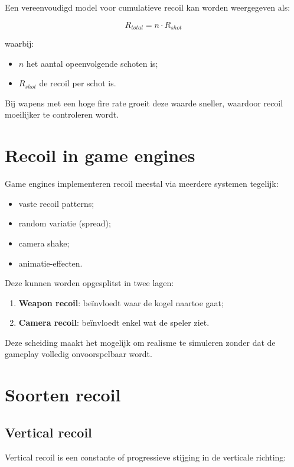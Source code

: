 Een vereenvoudigd model voor cumulatieve recoil kan worden weergegeven als:

\[
R_{total} = n \cdot R_{shot}
\]

waarbij:
\begin{itemize}
    \item $n$ het aantal opeenvolgende schoten is;
    \item $R_{shot}$ de recoil per schot is.
\end{itemize}

Bij wapens met een hoge fire rate groeit deze waarde sneller, waardoor recoil moeilijker te controleren wordt.

\section{Recoil in game engines}

Game engines implementeren recoil meestal via meerdere systemen tegelijk:

\begin{itemize}
    \item vaste recoil patterns;
    \item random variatie (spread);
    \item camera shake;
    \item animatie-effecten.
\end{itemize}

Deze kunnen worden opgesplitst in twee lagen:

\begin{enumerate}
    \item \textbf{Weapon recoil}: beïnvloedt waar de kogel naartoe gaat;
    \item \textbf{Camera recoil}: beïnvloedt enkel wat de speler ziet.
\end{enumerate}

Deze scheiding maakt het mogelijk om realisme te simuleren zonder dat de gameplay volledig onvoorspelbaar wordt.

\section{Soorten recoil}

\subsection{Vertical recoil}

Vertical recoil is een constante of progressieve stijging in de verticale richting:

